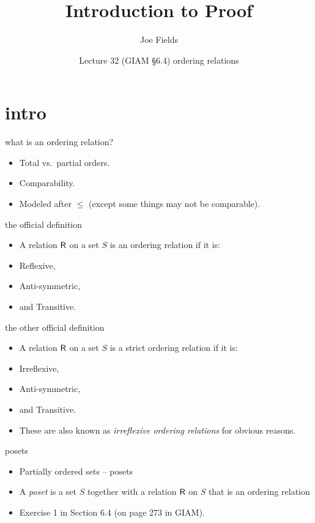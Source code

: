 \documentclass[handout,landscape]{beamer}
\author{Joe Fields}
\title{Introduction to Proof}
\date{Lecture 32 (GIAM \S 6.4) \newline ordering relations}
\institute[SCSU]{ {\tt fieldsj1@southernct.edu} }
\begin{document}
\begin{frame}[plain]
  \titlepage
\end{frame}

\section{intro}

\begin{frame}{what is an ordering relation?}
\begin{itemize}
\item Total vs.\ partial orders.\pause
\item Comparability.\pause
\item Modeled after $\leq$ (except some things may not be comparable).
\end{itemize}
\end{frame}

\begin{frame}{the official definition}
\begin{itemize}
\item A relation $\mbox{\textsf R}$ on a set $S$ is an ordering relation if it is:\pause
\item Reflexive,\pause
\item Anti-symmetric,\pause
\item and Transitive.
\end{itemize}
\end{frame}

\begin{frame}{the other official definition}
\begin{itemize}
\item A relation $\mbox{\textsf R}$ on a set $S$ is a strict ordering relation if it is:\pause
\item Irreflexive,\pause
\item Anti-symmetric,\pause
\item and Transitive. \pause
\item These are also known as {\em irreflexive ordering relations} for obvious reasons.
\end{itemize}
\end{frame}

\begin{frame}{posets}
\begin{itemize}
\item Partially ordered sets -- posets \pause
\item A {\em poset} is a set $S$ together with a relation $\mbox{\textsf R}$ on $S$ that is an ordering relation\pause
\item Exercise 1 in Section 6.4 (on page 273 in GIAM).
\end{itemize}
\end{frame}
\end{document}

